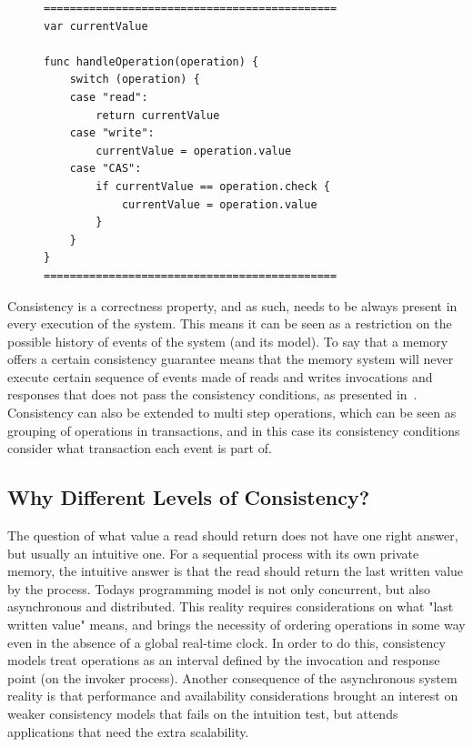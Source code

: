 \documentclass[12pt,conference]{IEEEtran}
\begin{document}
\begin{figure}[!t]
    \scriptsize
\begin{lstlisting}[caption={A Linearizable Register Model.},label={linearizableModelCode}]
=============================================
var currentValue

func handleOperation(operation) {
    switch (operation) {
    case "read":
        return currentValue
    case "write":
        currentValue = operation.value
    case "CAS":
        if currentValue == operation.check {
            currentValue = operation.value
        }
    }
}
=============================================
\end{lstlisting}
\end{figure}

Consistency is a correctness property, and as such, needs to be always present in every execution of the system. This means it can be seen as a restriction on the possible history of events of the system (and its model). To say that a memory offers a certain consistency guarantee means that the memory system will never execute certain sequence of events made of reads and writes invocations and responses that does not pass the consistency conditions, as presented in~\cite{dziuma2013survey}. Consistency can also be extended to multi step operations, which can be seen as grouping of operations in transactions, and in this case its consistency conditions consider what transaction each event is part of.

\subsection{Why Different Levels of Consistency?}

The question of what value a read should return does not have one right answer, but usually an intuitive one. For a sequential process with its own private memory, the intuitive answer is that the read should return the last written value by the process. Todays programming model is not only concurrent, but also asynchronous and distributed. This reality requires considerations on what "last written value" means, and brings the necessity of ordering operations in some way even in the absence of a global real-time clock. In order to do this, consistency models treat operations as an interval defined by the invocation and response point (on the invoker process). Another consequence of the asynchronous system reality is that performance and availability considerations brought an interest on weaker consistency models that fails on the intuition test, but attends applications that need the extra scalability.
\end{document}
